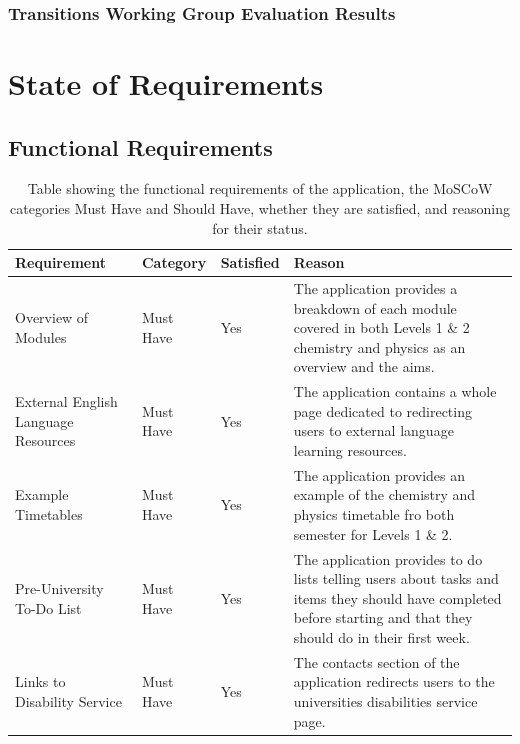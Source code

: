 \documentclass{l4proj}
\begin{document}
\begin{appendices}
\subsection{Transitions Working Group Evaluation Results} \label{app:evalTwgResults}


\chapter{State of Requirements} \label{app:reqMet}
\section{Functional Requirements} \label{app:funcMet}
\begin{table}[]
    \caption{Table showing the functional requirements of the application,  the MoSCoW categories Must Have and Should Have,  whether they are satisfied,  and reasoning for their status. }\label{tab:functionalApp}
    \begin{tabular}{ m{3cm}  m{2cm}  m{1.5cm}  m{17em} }
    \hline
    \textbf{Requirement}    & \textbf{Category}                & \textbf{Satisfied}      & \textbf{Reason}                      \\ %
    \hline
    
    Overview of Modules  &  Must Have              & Yes                 & The application provides a breakdown of each module covered in both Levels 1 \& 2 chemistry and physics as an overview and the aims. \\

    External English Language Resources & Must Have & Yes & The application contains a whole page dedicated to redirecting users to external language learning resources. \\

    Example Timetables & Must Have & Yes & The application provides an example of the chemistry and physics timetable fro both semester for Levels 1 \& 2. \\

    Pre-University To-Do List & Must Have & Yes & The application provides to do lists telling users about tasks and items they should have completed before starting and that they should do in their first week. \\
    
    Links to Disability Service & Must Have & Yes & The contacts section of the application redirects users to the universities disabilities service page. \\
    

\end{tabular}
\end{table}
\end{appendices}
\end{document}
